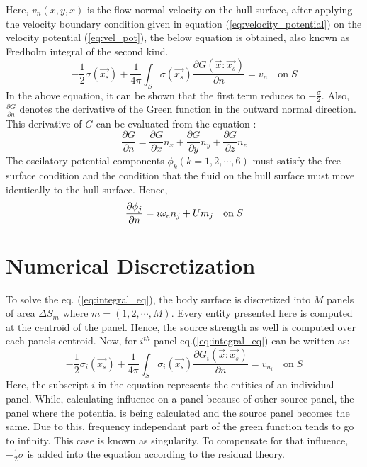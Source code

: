 Here, $v_n(x, y, x)$ is the flow normal velocity on the hull surface, after applying the velocity boundary condition given in equation (\ref{eq:velocity_potential}) on the velocity potential (\ref{eq:vel_pot}), the below equation is obtained, also known as Fredholm integral of the second kind.
\begin{equation}
    \label{eq:integral_eq}
    -\frac{1}{2}\sigma(\vec{x_s}) + \frac{1}{4\pi}\int_S\sigma(\vec{x_s})\frac{\partial G(\vec{x}:\vec{x_s})}{\partial n} = v_n \quad \text{on}\; S
\end{equation}
In the above equation, it can be shown that the first term reduces to $-\frac{\sigma}{2}$. Also, 
$\frac{\partial G}{\partial n}$ denotes the derivative of the Green function in the outward normal direction. This derivative of $G$ can be evaluated from the equation :
\begin{equation}
    \frac{\partial G}{\partial n} = \frac{\partial G}{\partial x}n_x + \frac{\partial G}{\partial y}n_y + \frac{\partial G}{\partial z}n_z
\end{equation}
The oscilatory potential components $\phi_k(k=1, 2, \cdots, 6)$ must satisfy the free-surface condition
and the condition that the fluid on the hull surface must move identically to the hull surface. Hence, 
\begin{equation}
    \frac{\partial \phi_j}{\partial n} = i\omega_e n_j + Um_j \quad \text{on}\; S \\
\end{equation}



\section{Numerical Discretization}
\label{sec:numerical_dis}
To solve the eq. (\ref{eq:integral_eq}), the body surface is discretized into $M$ panels of area 
$\Delta S_m$ where $m = (1, 2, \cdots, M)$. Every entity presented here is computed at the centroid of the panel.
Hence, the source strength as well is computed over each panels centroid. Now, for $i^{th}$ panel eq.(\ref{eq:integral_eq}) can be written as:
\begin{equation}
    \label{eq:dis_integral_eq}
    -\frac{1}{2}\sigma_i(\vec{x_s}) + \frac{1}{4\pi}\int_S\sigma_i(\vec{x_s})\frac{\partial G_i(\vec{x}:\vec{x_s})}{\partial n} = v_{n_i} \quad \text{on}\; S
\end{equation}
Here, the subscript $i$ in the equation represents the entities of an individual panel.
While, calculating influence on a panel because of other source panel, the panel where the potential is being calculated and the source panel becomes the same. Due to this, frequency independant part of the green function tends to go to infinity. This case is known as singularity. To compensate for that influence, $-\frac{1}{2}\sigma$ is added into the equation according to the residual theory.

